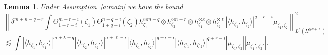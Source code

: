 \documentclass[a4paper,11pt]{article}
\newtheorem{lemma}[theorem]{Lemma}
{\theorembodyfont{\rmfamily}\newtheorem{remark}[theorem]{Remark}}
\begin{document}
\begin{lemma}
  \label{l:est-binary}Under Assumption~\ref{a:main} we have the bound
  \[ \left\| \delta^{m + n - q - r} \int \Theta^{m + r - i}_{1 + r - i}
     (\zeta_1) \Theta_{1 + q - i}^{n + q - i} (\zeta_2) h_{\zeta_1}^{\otimes m
     - q} \otimes h^{\otimes n - r}_{\zeta_2} \otimes h^{\otimes k}_{\zeta_1}
     \otimes h^{\otimes \ell}_{\zeta_2} | \langle h_{\zeta_1}, h_{\zeta_2}
     \rangle |^{q + r - i} \mu_{\zeta_1, \zeta_2} \right\|^2_{L^p (H^{\otimes
     k + \ell})} \]
  \[ \lesssim \int | \langle h_{\zeta_1}, h_{\zeta_1'} \rangle |^{m + k - q} |
     \langle h_{\zeta_2}, h_{\zeta_2'} \rangle |^{n + \ell - r} | \langle
     h_{\zeta_1}, h_{\zeta_2} \rangle |^{q + r - i} | \langle h_{\zeta'_1},
     h_{\zeta'_2} \rangle |^{q + r - i} | \mu_{\zeta_1, \zeta_2} | |
     \mu_{\zeta_1', \zeta_2'} | . \]
\end{lemma}
\end{document}
